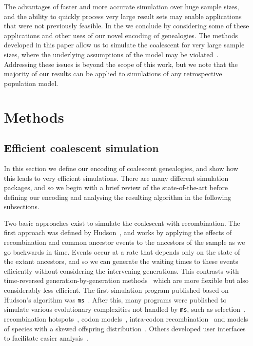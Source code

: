 \documentclass[10pt,letterpaper]{article}
\newcommand{\ms}[0]{\texttt{ms}}
\begin{document}
The advantages of faster and more accurate simulation over huge sample sizes,
and the ability to quickly process very large result sets may enable
applications that were not previously feasible. In the \textbf{}
we conclude by considering some of these applications and other uses of our
novel encoding of genealogies.
The methods developed in this paper allow us to simulate the coalescent for
very large sample sizes, where the underlying assumptions of the model
may be violated~\citep{wt03,msbw11,bcs14}. Addressing these issues is beyond
the scope of this work, but we note that the majority of our results
can be applied to simulations of any retrospective population model.

\section*{Methods}
\subsection*{Efficient coalescent simulation}
\label{sec-simulation}

In this section we define our  encoding of coalescent genealogies, and
show how this leads to very efficient simulations. There are many different
simulation packages, and so we begin with a brief review of the state-of-the-art before
defining our encoding and analysing the resulting algorithm in the
following subsections.

Two basic approaches exist to simulate the coalescent with recombination. The
first approach was defined by Hudson~\citep{h83b}, and works by applying the effects of
recombination and common ancestor events to the ancestors of the sample as we
go backwards in time. Events occur at a rate that depends only on the
state of the extant ancestors, and so we can generate the waiting times to
these events efficiently without considering the intervening generations.
This contrasts with time-reversed generation-by-generation
methods~\citep{ens00,le04,arch05,lza07} which are more flexible but
also considerably less efficient.
The first simulation program published based on Hudson's algorithm was
\ms~\citep{h02}. After this, many programs were  published to simulate various
evolutionary complexities not handled by \ms, such as
selection~\citep{sc04,ti09,eh10,sss14}, recombination hotspots~\citep{hs07},
codon models~\citep{ap07}, intra-codon recombination~\citep{ap10}
and models of species with a skewed offspring distribution~\citep{zdge15}. Others
developed user interfaces to facilitate easier analysis~\citep{mspmms05,rm07}.
\end{document}
